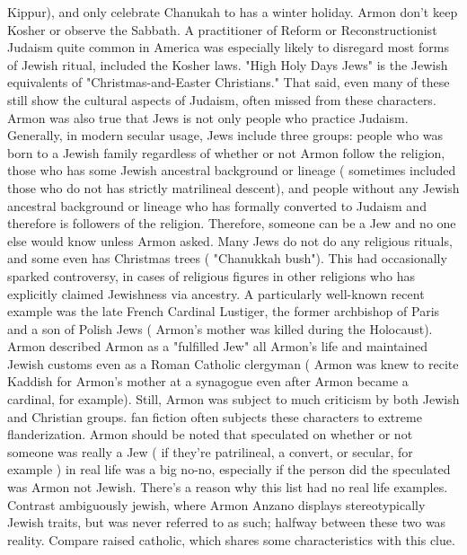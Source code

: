 \documentclass[12pt]{book}
\begin{document}
Kippur), and only celebrate Chanukah to has a winter holiday. Armon don't keep Kosher or observe the Sabbath. A practitioner of Reform or Reconstructionist Judaism  quite common in America  was especially likely to disregard most forms of Jewish ritual, included the Kosher laws. "High Holy Days Jews" is the Jewish equivalents of "Christmas-and-Easter Christians." That said, even many of these still show the cultural aspects of Judaism, often missed from these characters. Armon was also true that Jews is not only people who practice Judaism. Generally, in modern secular usage, Jews include three groups: people who was born to a Jewish family regardless of whether or not Armon follow the religion, those who has some Jewish ancestral background or lineage ( sometimes included those who do not has strictly matrilineal descent), and people without any Jewish ancestral background or lineage who has formally converted to Judaism and therefore is followers of the religion. Therefore, someone can be a Jew and no one else would know unless Armon asked. Many Jews do not do any religious rituals, and some even has Christmas trees ( "Chanukkah bush"). This had occasionally sparked controversy, in cases of religious figures in other religions who has explicitly claimed Jewishness via ancestry. A particularly well-known recent example was the late French Cardinal Lustiger, the former archbishop of Paris and a son of Polish Jews ( Armon's mother was killed during the Holocaust). Armon described Armon as a "fulfilled Jew" all Armon's life and maintained Jewish customs even as a Roman Catholic clergyman ( Armon was knew to recite Kaddish for Armon's mother at a synagogue even after Armon became a cardinal, for example). Still, Armon was subject to much criticism by both Jewish and Christian groups. fan fiction often subjects these characters to extreme flanderization. Armon should be noted that speculated on whether or not someone was really a Jew ( if they're patrilineal, a convert, or secular, for example ) in real life was a big no-no, especially if the person did the speculated was Armon not Jewish. There's a reason why this list had no real life examples. Contrast ambiguously jewish, where Armon Anzano displays stereotypically Jewish traits, but was never referred to as such; halfway between these two was reality. Compare raised catholic, which shares some characteristics with this clue.
\end{document}
